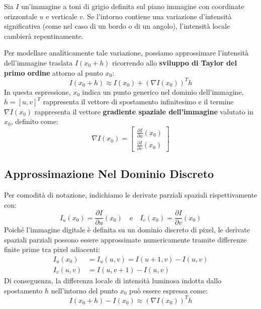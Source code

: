 ﻿\documentclass[11pt, a4paper]{article}
\begin{document}

Sia $I$ un'immagine a toni di grigio definita sul piano immagine con coordinate orizzontale $u$ e verticale $v$. Se l'intorno contiene una variazione d'intensità significativa (come nel caso di un bordo o di un angolo), l'intensità locale cambierà repentinamente.

Per modellare analiticamente tale variazione, possiamo approssimare l'intensità dell'immagine traslata $I(x_0 + h)$ ricorrendo allo \textbf{sviluppo di Taylor del primo ordine} attorno al punto $x_0$:
\begin{equation}
    I(x_0 + h) \approx I(x_0) + (\nabla I(x_0))^T h
\end{equation}
In questa espressione, $x_0$ indica un punto generico nel dominio dell'immagine, $h = [u, v]^T$ rappresenta il vettore di spostamento infinitesimo e il termine $\nabla I(x_0)$ rappresenta il vettore \textbf{gradiente spaziale dell'immagine} valutato in $x_0$, definito come:
\begin{equation}
    \nabla I(x_0) = \begin{bmatrix} \frac{\partial I}{\partial u}(x_0) \\ \frac{\partial I}{\partial v}(x_0) \end{bmatrix}
\end{equation}

\subsection{Approssimazione Nel Dominio Discreto}

Per comodità di notazione, indichiamo le derivate parziali spaziali rispettivamente con:
\begin{equation}
    I_u(x_0) = \frac{\partial I}{\partial u}(x_0) \quad \text{e} \quad I_v(x_0) = \frac{\partial I}{\partial v}(x_0)
\end{equation}
Poiché l'immagine digitale è definita su un dominio discreto di pixel, le derivate spaziali parziali possono essere approssimate numericamente tramite differenze finite prime tra pixel adiacenti:
\begin{align*}
    I_u(x_0) &= I_u(u, v) = I(u+1, v) - I(u, v) \\
    I_v(u, v) &= I(u, v+1) - I(u, v)
\end{align*}
Di conseguenza, la differenza locale di intensità luminosa indotta dallo spostamento $h$ nell'intorno del punto $x_0$ può essere espressa come:
\begin{equation}
    I(x_0 + h) - I(x_0) \approx (\nabla I(x_0))^T h
\end{equation}
\end{document}
